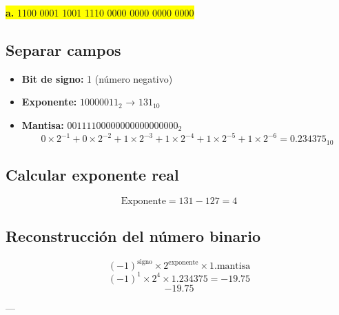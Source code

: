 \documentclass[a4paper,12pt]{article}
\begin{document}
	\begin{center}
	\colorbox{yellow}{\textbf{a.} 1100 0001 1001 1110 0000 0000 0000 0000}

	\subsection*{Separar campos}
	
	\begin{itemize}
		\item \textbf{Bit de signo:} 1 (número negativo)
		\item \textbf{Exponente:} $10000011_2$ → $131_{10}$
		\item \textbf{Mantisa:} $00111100000000000000000_2$ 
		\[
		0\times2^{-1} + 0\times2^{-2} + 1\times2^{-3} + 1\times2^{-4} + 1\times2^{-5} + 1\times2^{-6} = 0.234375_{10}
		\]
	\end{itemize}
	
	\subsection*{Calcular exponente real}
	
	\[
	\text{Exponente} = 131 - 127 = 4
	\]
	

	
	\subsection*{Reconstrucción del número binario}	
	\[
	(-1)^{\text{signo}} \times 2^{\text{exponente}} \times 1.\text{mantisa}
	\]
	\[
	(-1)^1 \times 2^4 \times 1.234375 = -19.75
	\]
	\vspace{1em}
	\[
	\boxed{-19.75}
	\]
	
	---
	\end{center}
\end{document}
